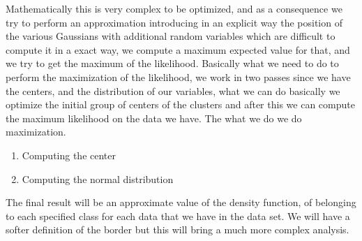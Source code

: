 \documentclass{article}
\begin{document}
Mathematically this is very complex to be optimized, and as a consequence we try to perform an approximation introducing
in an explicit way the position of the various Gaussians with additional random variables which are difficult to
compute it in a exact way, we compute a maximum expected value for that, and we try to get the
maximum of the likelihood.
\newline\newline
Basically what we need to do to perform the maximization of the likelihood, we work in two passes since we have the centers,
and the distribution of our variables, what we can do basically we optimize the initial group
of centers of the clusters and after this we can compute the maximum likelihood on the data we have.
The what we do we do maximization.
\begin{enumerate}
    \item Computing the center
    \item Computing the normal distribution
\end{enumerate}
The final result will be an approximate value of the density function, of belonging to each
specified class for each data that we have in the data set. We will have a softer definition of
the border but this will bring a much more complex analysis.
\end{document}
